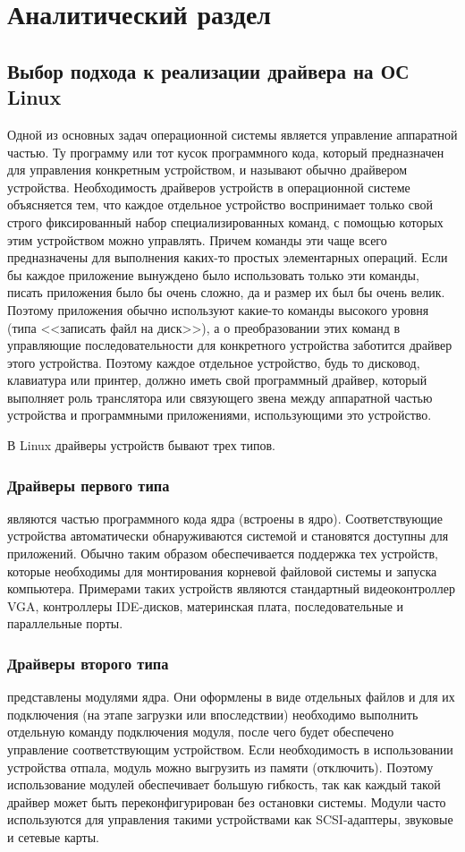 \chapter{Аналитический раздел}

\section{Выбор подхода к реализации драйвера на ОС Linux}

Одной из основных задач операционной системы является управление аппаратной частью. Ту программу или тот кусок программного кода, который предназначен для управления конкретным устройством, и называют обычно драйвером устройства. Необходимость драйверов устройств в операционной системе объясняется тем, что каждое отдельное устройство воспринимает только свой строго фиксированный набор специализированных команд, с помощью которых этим устройством можно управлять. Причем команды эти чаще всего предназначены для выполнения каких-то простых элементарных операций. Если бы каждое приложение вынуждено было использовать только эти команды, писать приложения было бы очень сложно, да и размер их был бы очень велик. Поэтому приложения обычно используют какие-то команды высокого уровня (типа <<записать файл на диск>>), а о преобразовании этих команд в управляющие последовательности для конкретного устройства заботится драйвер этого устройства. Поэтому каждое отдельное устройство, будь то дисковод, клавиатура или принтер, должно иметь свой программный драйвер, который выполняет роль транслятора или связующего звена между аппаратной частью устройства и программными приложениями, использующими это устройство. \cite{kostomin}

В Linux драйверы устройств бывают трех типов.

\subsection{Драйверы первого типа} являются частью программного кода ядра (встроены в ядро). Соответствующие устройства автоматически обнаруживаются системой и становятся доступны для приложений. Обычно таким образом обеспечивается поддержка тех устройств, которые необходимы для монтирования корневой файловой системы и запуска компьютера. Примерами таких устройств являются стандартный видеоконтроллер VGA, контроллеры IDE-дисков, материнская плата, последовательные и параллельные порты.

\subsection{Драйверы второго типа} представлены модулями ядра. Они оформлены в виде отдельных файлов и для их подключения (на этапе загрузки или впоследствии) необходимо выполнить отдельную команду подключения модуля, после чего будет обеспечено управление соответствующим устройством. Если необходимость в использовании устройства отпала, модуль можно выгрузить из памяти (отключить). Поэтому использование модулей обеспечивает большую гибкость, так как каждый такой драйвер может быть переконфигурирован без остановки системы. Модули часто используются для управления такими устройствами как SCSI-адаптеры, звуковые и сетевые карты.

